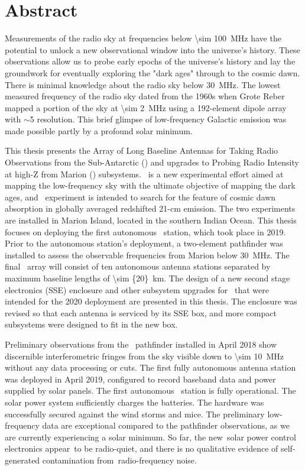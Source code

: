 \section*{Abstract}

Measurements of the radio sky at frequencies below \SI{\sim 100}{\mega \hertz} have the potential to unlock a new observational window into the universe's history. These observations allow us to probe early epochs of the universe's history and lay the groundwork for eventually exploring the "dark ages" through to the cosmic dawn. There is minimal knowledge about the radio sky below \SI{30}{\mega \hertz}. The lowest measured frequency of the radio sky dated from the 1960s when Grote Reber mapped a portion of the sky at \SI{\sim 2}{\mega \hertz} using a 192-element dipole array with $\sim$5 \degree resolution. This brief glimpse of low-frequency Galactic emission was made possible partly by a profound solar minimum.

This thesis presents the Array of Long Baseline Antennas for Taking Radio Observations from the Sub-Antarctic (\albatros) and upgrades to Probing Radio Intensity at high-Z from Marion (\prizm) subsystems. \albatros\ is a new experimental effort aimed at mapping the low-frequency sky with the ultimate objective of mapping the dark ages, and \prizm\ experiment is intended to search for the feature of cosmic dawn absorption in globally averaged redshifted 21-cm emission. The two experiments are installed in Marion Island, located in the southern Indian Ocean.  This thesis focuses on deploying the first autonomous \albatros\ station, which took place in 2019. Prior to the autonomous station's deployment, a two-element pathfinder was installed to assess the observable frequencies from Marion below \SI{30}{\mega \hertz}. The final \albatros\ array will consist of ten autonomous antenna stations separated by maximum baseline lengths of \SI{\sim {20}}{km}. The design of a new second stage electronics (SSE) enclosure and other subsystem upgrades for \prizm\ that were intended for the 2020 deployment are presented in this thesis. The enclosure was revised so that each antenna is serviced by its SSE box, and more compact subsystems were designed to fit in the new box.

Preliminary observations from the \albatros\ pathfinder installed in April 2018 show discernible interferometric fringes from the sky visible down to \SI{\sim 10}{\mega \hertz} without any data processing or cuts. The first fully autonomous antenna station was deployed in April 2019, configured to record baseband data and power supplied by solar panels. The first autonomous \albatros\ station is fully operational. The solar power system sufficiently charges the batteries. The hardware was successfully secured against the wind storms and mice. The preliminary low-frequency data are exceptional compared to the pathfinder observations, as we are currently experiencing a solar minimum. So far, the new solar power control electronics appear to be radio-quiet, and there is no qualitative evidence of self-generated contamination from radio-frequency noise.
